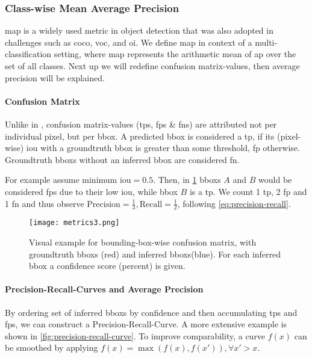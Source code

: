 \subsubsection{Class-wise Mean Average Precision}\label{subsect:mAP}
\Gls{map} is a widely used metric in object detection that was also adopted in
challenges such as \gls{coco}, \gls{voc}, and \gls{oi}. We define \gls{map} in
context of a multi-classification setting, where \gls{map} represents the
arithmetic mean of \gls{ap} over the set of all classes. Next up we will
redefine confusion matrix-values, then average precision will be explained.

\paragraph{Confusion Matrix}
Unlike in , confusion matrix-values
(\glspl{tp}, \glspl{fp} \& \glspl{fn}) are attributed not per individual pixel,
but per \gls{bbox}. A predicted \gls{bbox} is considered a \gls{tp}, if its
(pixel-wise) \gls{iou} with a groundtruth \gls{bbox} is greater than some
threshold, \gls{fp} otherwise. Groundtruth \glspl{bbox} without an inferred
\gls{bbox} are considered \gls{fn}.
\par
For example assume minimum \gls{iou}\(=0.5\). Then, in
\cref{fig:bbox-precision-recall} \glspl{bbox} \(A\) and \(B\) would be considered
\glspl{fp} due to their low \gls{iou}, while \gls{bbox} \(B\) is a \gls{tp}.
We count 1 \gls{tp}, 2 \gls{fp} and 1 \gls{fn} and thus observe
\(\text{Precision} = \frac{1}{3}, \text{Recall} = \frac{1}{2}\), following
\cref{eq:precision-recall}.

\begin{figure}[htp!]
    \centering
    \texttt{[image: metrics3.png]}
    \caption{Visual example for bounding-box-wise confusion matrix, with
    groundtruth \glspl{bbox} (red) and inferred \glspl{bbox}(blue). For each
    inferred \gls{bbox} a confidence score (percent) is given.}\label{fig:bbox-precision-recall}
\end{figure}

\paragraph{Precision-Recall-Curves and Average Precision}\label{par:precision-recall-curves-ap}
By ordering set of inferred \glspl{bbox} by confidence and then accumulating
\glspl{tp} and \glspl{fp}, we can construct a Precision-Recall-Curve.
A more extensive example is shown in \cref{fig:precision-recall-curve}.
To improve comparability, a curve \(f(x)\) can be smoothed by applying
\(f(x) = \max (f(x), f(x')), \forall x' > x\). 

